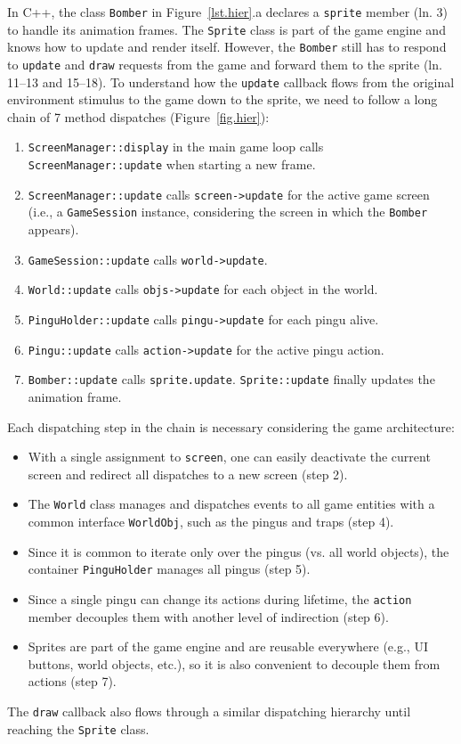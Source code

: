 \documentclass{vgtc}                          %
\newcommand{\code}[1] {{\small{\texttt{#1}}}}
\begin{document}
In C++, the class \code{Bomber} in Figure~\ref{lst.hier}.a declares a
\code{sprite} member (ln. 3) to handle its animation frames.
%
The \code{Sprite} class is part of the game engine and knows how to update and
render itself.
However, the \code{Bomber} still has to respond to \code{update} and
\code{draw} requests from the game and forward them to the sprite
(ln. 11--13 and 15--18).
%
To understand how the \code{update} callback flows from the original
environment stimulus to the game down to the sprite, we need to follow a long
chain of 7 method dispatches (Figure~\ref{fig.hier}):
%
\begin{enumerate}
\item \code{ScreenManager::display} in the main game loop calls
      \code{ScreenManager::update} when starting a new frame.
\item \code{ScreenManager::update} calls \code{screen->update} for the active
      game screen (i.e., a \code{GameSession} instance, considering the screen
      in which the \code{Bomber} appears).
\item \code{GameSession::update} calls \code{world->update}.
\item \code{World::update} calls \code{objs->update} for each object in the
      world.
\item \code{PinguHolder::update} calls \code{pingu->update} for each pingu
      alive.
\item \code{Pingu::update} calls \code{action->update} for the active pingu
      action.
\item \code{Bomber::update} calls \code{sprite.update}.
      \code{Sprite::update} finally updates the animation frame.
\end{enumerate}
%
Each dispatching step in the chain is necessary considering the game
architecture:
%
\begin{itemize}
\item With a single assignment to \code{screen}, one can easily deactivate the
current screen and redirect all dispatches to a new screen (step 2).
\item The \code{World} class manages and dispatches events to all game
      entities with a common interface \code{WorldObj}, such as the pingus and
      traps (step 4).
\item Since it is common to iterate only over the pingus (vs. all world
      objects), the container \code{PinguHolder} manages all pingus (step 5).
\item Since a single pingu can change its actions during lifetime, the
      \code{action} member decouples them with another level of indirection
      (step 6).
\item Sprites are part of the game engine and are reusable everywhere (e.g., UI
      buttons, world objects, etc.), so it is also convenient to decouple them
      from actions (step 7).
\end{itemize}
%
The \code{draw} callback also flows through a similar dispatching hierarchy
until reaching the \code{Sprite} class.
\end{document}
